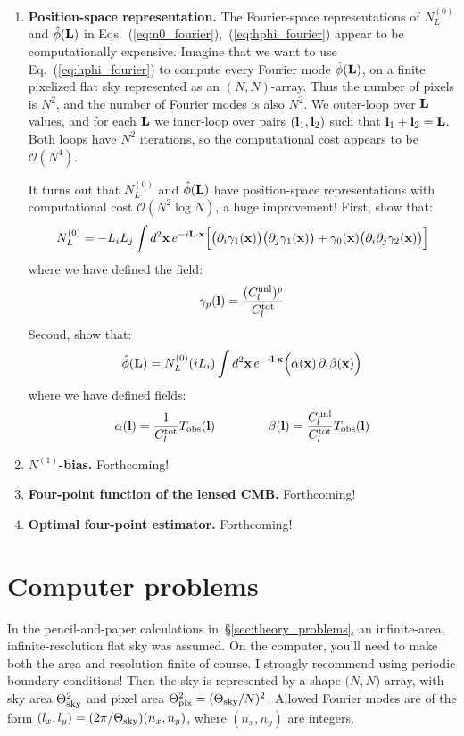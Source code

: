 \documentclass[aps,prd,superscriptaddress,groupedaddress,nofootinbib,nobibnotes]{revtex4}
\newcommand{\be}{\begin{equation}}
\newcommand{\ee}{\end{equation}}
\newcommand{\bigoh}{\mathcal{O}}
\def\x{{\bf x}}
\def\l{{\bf l}}
\def\L{{\bf L}}
\def\hphi{{\hat\phi}}
\begin{document}
\begin{enumerate}
\item {\bf Position-space representation.}
The Fourier-space representations of $N_L^{(0)}$ and $\hphi(\L)$ in Eqs.~(\ref{eq:n0_fourier}),~(\ref{eq:hphi_fourier})
appear to be computationally expensive.  Imagine that we want to use Eq.~(\ref{eq:hphi_fourier}) to compute every Fourier
mode $\hphi(\L)$, on a finite pixelized flat sky represented as an $(N,N)$-array.  Thus the number of pixels
is $N^2$, and the number of Fourier modes is also $N^2$.  We outer-loop over $\L$ values, and for each $\L$
we inner-loop over pairs $(\l_1,\l_2)$ such that $\l_1+\l_2=\L$.  Both loops have $N^2$ iterations, so the
computational cost appears to be $\bigoh(N^4)$.

It turns out that $N_L^{(0)}$ and $\hphi(\L)$ have position-space representations with computational cost
$\bigoh(N^2 \log N)$, a huge improvement!  First, show that:
\be
N_L^{(0)} = -L_i L_j \int d^2\x \, e^{-i\L\cdot\x} \Big[
  \big( \partial_i \gamma_1(\x) \big) \big( \partial_j \gamma_1(\x) \big) +
  \gamma_0(\x) \big( \partial_i \partial_j \gamma_2(\x) \big) \Big]  \label{eq:n0_position}
\ee
where we have defined the field:
\be
\gamma_p(\l) = \frac{(C_l^{\rm unl})^p}{C_l^{\rm tot}}
\ee
Second, show that:
\be
\hphi(\L) =  N_L^{(0)} (iL_i) \int d^2\x \, e^{-i\l\cdot\x} \Big( \alpha(\x) \, \partial_i \beta(\x) \Big)  \label{eq:hphi_position}
\ee
where we have defined fields:
\be
\alpha(\l) = \frac{1}{C_l^{\rm tot}} T_{\rm obs}(\l)
\hspace{1.5cm}
\beta(\l) = \frac{C_l^{\rm unl}}{C_l^{\rm tot}} T_{\rm obs}(\l)
\ee

\item {\bf $N^{(1)}$-bias.}  Forthcoming!
  
\item {\bf Four-point function of the lensed CMB.}  Forthcoming!

\item {\bf Optimal four-point estimator.}  Forthcoming!

\setcounter{enumi_save}{\value{enumi}}
\end{enumerate}

\section{Computer problems}
\label{sec:computer_problems}

In the pencil-and-paper calculations in~\S\ref{sec:theory_problems}, an infinite-area, infinite-resolution flat sky was assumed.
On the computer, you'll need to make both the area and resolution finite of course.
I strongly recommend using periodic boundary conditions!
Then the sky is represented by a shape $(N,N$) array, with sky area $\Theta_{\rm sky}^2$ and pixel area $\Theta_{\rm pix}^2 = (\Theta_{\rm sky}/N)^2$.
Allowed Fourier modes are of the form $(l_x, l_y) = (2\pi/\Theta_{\rm sky}) (n_x, n_y)$, where $(n_x,n_y)$ are integers.
\end{document}
